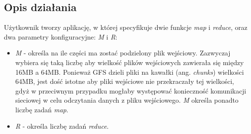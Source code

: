 \subsection*{Opis działania}

Użytkownik tworzy aplikację, w której specyfikuje dwie funkcje \emph{map} i \emph{reduce}, oraz dwa parametry konfiguracyjne: \emph{M} i \emph{R}:

\begin{itemize}
 \item \emph{M} - określa na ile części ma zostać podzielony plik wejściowy.
 Zazwyczaj wybiera się taką liczbę aby wielkość plików wejściowych zawierała się między 16MB a 64MB.
 Ponieważ GFS dzieli pliki na kawałki (ang. \emph{chunks}) wielkości 64MB, jest dość istotne aby pliki wejściowe nie przekraczały tej wielkości, gdyż w przeciwnym przypadku mogłaby występować konieczność komunikacji sieciowej w celu odczytania danych z pliku wejściowego.
 \emph{M} określa ponadto liczbę zadań \emph{map}.
 \item \emph{R} - określa liczbę zadań \emph{reduce}.
\end{itemize}


